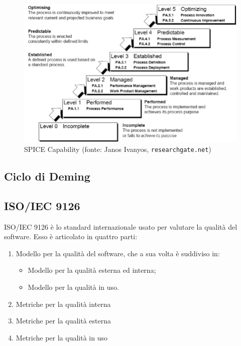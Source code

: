 \begin{figure}[H]
		\centering
		\includegraphics[scale=0.5]{./res/img/ISO_IEC_15504.png}
		\caption[Modello ISO/IEC 15504]{SPICE Capability (fonte: Janos Ivanyos, \texttt{researchgate.net})}
\end{figure}

\subsection{Ciclo di Deming}

\subsection{ISO/IEC 9126}
ISO/IEC 9126 è lo standard internazionale usato per valutare la qualità del software. Esso è articolato in quattro parti:
\begin{enumerate}
	\item{Modello per la qualità del software, che a sua volta è suddiviso in:}
	\begin{itemize}
		\item{Modello per la qualità esterna ed interna;}
		\item{Modello per la qualità in uso.}
	\end{itemize}
	\item{Metriche per la qualità interna}
	\item{Metriche per la qualità esterna}
	\item{Metriche per la qualità in uso}
\end{enumerate}

